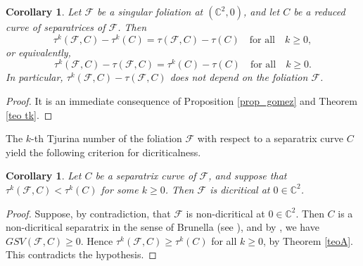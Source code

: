 \documentclass[12pt,letterpaper]{amsart}
\newcommand{\C}{\mathbb{C}}
\newcommand{\F}{\mathcal{F}}
\newtheorem{corollary}[theorem]{Corollary}
\begin{document}
\begin{corollary}
    Let $\F$ be a singular foliation at $(\C^2,0)$, and let $C$ be a reduced curve of separatrices of $\F$. Then
     \[\tau^{k}(\F,C)-\tau^{k}(C) = \tau(\F,C)-\tau(C)\quad\text{for all}\quad k\geq 0,\] 
     or equivalently,
     \[\tau^{k}(\F,C)-\tau(\F,C) = \tau^{k}(C)-\tau(C)\quad\text{for all}\quad k\geq 0.\] 
     In particular, $\tau^{k}(\F,C)-\tau(\F,C)$ does not depend on the foliation $\F$.
\end{corollary}
\begin{proof}
   It is an immediate consequence of Proposition \ref{prop_gomez} and Theorem \ref{teo tk}.
\end{proof}
\par The $k$-th Tjurina number of the foliation $\mathcal{F}$ with respect to a separatrix curve $C$ yield the following criterion for dicriticalness.
\begin{corollary}
    Let $C$ be a separatrix curve of $\mathcal{F}$, and suppose that $\tau^{k}(\mathcal{F}, C) < \tau^{k}(C)$ for some $k \geq 0$. Then $\mathcal{F}$ is dicritical at $0 \in \mathbb{C}^{2}$.
\end{corollary}
\begin{proof}
    Suppose, by contradiction, that $\F$ is non-dicritical at $0\in\C^2$. Then $C$ is a non-dicritical separatrix in the sense of Brunella (see \cite[p. 533]{index}), and by \cite[Proposition 6]{index}, we have $GSV(\F,C)\geq 0$. Hence $\tau^{k}(\mathcal{F}, C) \geq \tau^{k}(C)$ for all $k \geq 0$, by Theorem \ref{teoA}. This contradicts the hypothesis.  
\end{proof}
\end{document}
